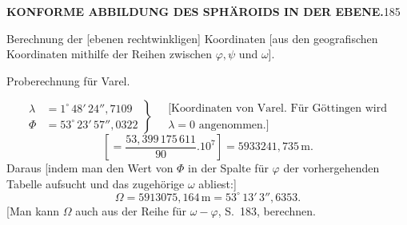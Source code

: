 \par\clearpage
\noindent\null\hfill{\small\textbf{KONFORME ABBILDUNG DES SPHÄROIDS IN DER EBENE.}}\hfill185\par\medskip
{\centering [29.]\par\medskip
Berechnung der [ebenen rechtwinkligen] Koordinaten [aus den geografischen\\
Koordinaten mithilfe der Reihen zwischen \(\varphi,\psi\) und \(\omega\)].\par\smallskip
Proberechnung für Varel.\par}
\[
\left.\begin{aligned}
\lambda&=1^\circ\,48'\,24''{,}7109\\
\Phi&=53^\circ\,23'\,57''{,}0322
\end{aligned}\right\}\quad
\begin{gathered}
\text{[Koordinaten von Varel. Für Göttingen wird}\\
\lambda=0\text{ angenommen.]}
\end{gathered}
\]
\[
\left[=\frac{53{,}399\,175\,611}{90}.10^7\right]=5933241{,}735\,\mathrm{m}.
\]
Daraus [indem man den Wert von \(\Phi\) in der Spalte für \(\varphi\) der vorhergehenden Tabelle aufsucht und das zugehörige \(\omega\) abliest:]
\[
\Omega=5913075{,}164\,\mathrm{m}=53^\circ\,13'\,3''{,}6353.
\]
[Man kann \(\Omega\) auch aus der Reihe für \(\omega-\varphi\), S.~183, berechnen.

